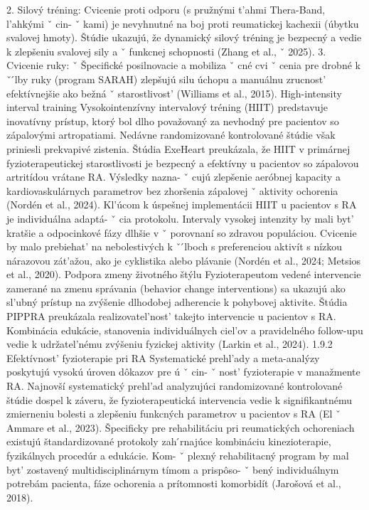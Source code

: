{ 2. Silový tréning: Cvicenie proti odporu (s pružnými t’ahmi Thera-Band, l’ahkými ˇ cin- ˇ kami) je nevyhnutné na boj proti reumatickej kachexii (úbytku svalovej hmoty). Štúdie ukazujú, že dynamický silový tréning je bezpecný a vedie k zlepšeniu svalovej sily a ˇ funkcnej schopnosti (Zhang et al., ˇ 2025).
 3. Cvicenie ruky: ˇ Špecifické posilnovacie a mobiliza ˇ cné cvi ˇ cenia pre drobné k ˇ  ́lby ruky (program SARAH) zlepšujú silu úchopu a manuálnu zrucnost’ efektívnejšie ako bežná ˇ starostlivost’ (Williams et al., 2015).
 High-intensity interval training Vysokointenzívny intervalový tréning (HIIT) predstavuje inovatívny prístup, ktorý bol dlho považovaný za nevhodný pre pacientov so zápalovými artropatiami. Nedávne randomizované kontrolované štúdie však priniesli prekvapivé zistenia. Štúdia ExeHeart preukázala, že HIIT v primárnej fyzioterapeutickej starostlivosti je bezpecný a efektívny u pacientov so zápalovou artritídou vrátane RA. Výsledky nazna- ˇ cujú zlepšenie aeróbnej kapacity a kardiovaskulárnych parametrov bez zhoršenia zápalovej ˇ aktivity ochorenia (Nordén et al., 2024).
 Kl’úcom k úspešnej implementácii HIIT u pacientov s RA je individuálna adaptá- ˇ cia protokolu. Intervaly vysokej intenzity by mali byt’ kratšie a odpocinkové fázy dlhšie v ˇ porovnaní so zdravou populáciou. Cvicenie by malo prebiehat’ na nebolestivých k ˇ  ́lboch s preferenciou aktivít s nízkou nárazovou zát’ažou, ako je cyklistika alebo plávanie (Nordén et al., 2024; Metsios et al., 2020).
 Podpora zmeny životného štýlu Fyzioterapeutom vedené intervencie zamerané na zmenu správania (behavior change interventions) sa ukazujú ako sl’ubný prístup na zvýšenie dlhodobej adherencie k pohybovej aktivite. Štúdia PIPPRA preukázala realizovatel’nost’ takejto intervencie u pacientov s RA. Kombinácia edukácie, stanovenia individuálnych ciel’ov a pravidelného follow-upu vedie k udržatel’nému zvýšeniu fyzickej aktivity (Larkin et al., 2024).
 1.9.2 Efektívnost’ fyzioterapie pri RA Systematické prehl’ady a meta-analýzy poskytujú vysokú úroven dôkazov pre ú ˇ cin- ˇ nost’ fyzioterapie v manažmente RA. Najnovší systematický prehl’ad analyzujúci randomizované kontrolované štúdie dospel k záveru, že fyzioterapeutická intervencia vedie k signifikantnému zmierneniu bolesti a zlepšeniu funkcných parametrov u pacientov s RA (El ˇ Ammare et al., 2023).
 Špecificky pre rehabilitáciu pri reumatických ochoreniach existujú štandardizované protokoly zah ́rnajúce kombináciu kinezioterapie, fyzikálnych procedúr a edukácie. Kom- ˇ plexný rehabilitacný program by mal byt’ zostavený multidisciplinárnym tímom a prispôso- ˇ bený individuálnym potrebám pacienta, fáze ochorenia a prítomnosti komorbidít (Jarošová et al., 2018).
}
